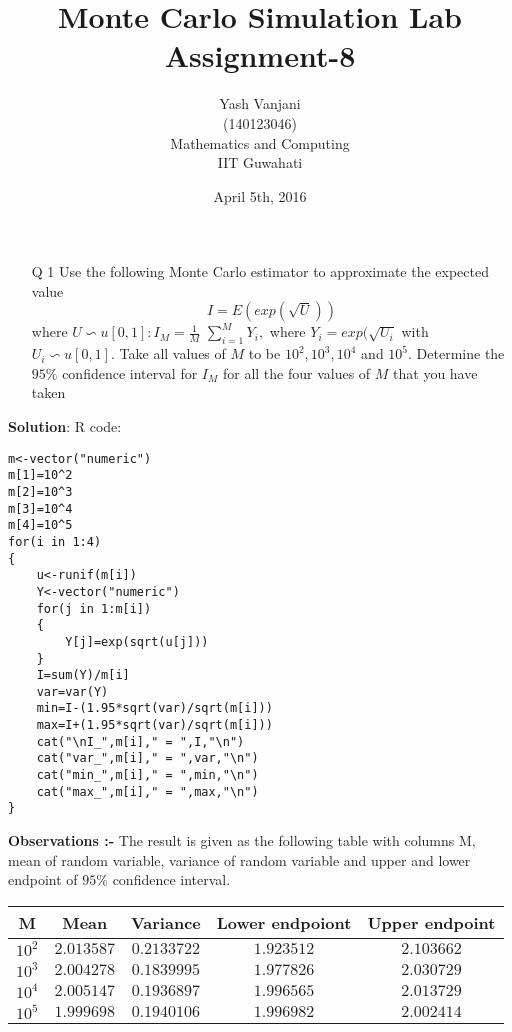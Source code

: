 \documentclass[12pt]{book}
\begin{document}
\title{\textbf{Monte Carlo Simulation Lab Assignment-8}}
\author{Yash Vanjani\\(140123046)\\Mathematics and Computing\\IIT Guwahati}
\date{April 5th, 2016}

\maketitle

\newpage
\begin{enumerate}
\item[Q 1] Use the following Monte Carlo estimator to approximate the expected value \newline $$I=E(exp(\sqrt{U}))$$ \newline where $U\backsim{u}[0,1]:I_M=\frac{1}{M}$ $\sum_{i=1}^M Y_i,$ where $Y_i= exp(\sqrt{U_i}$ with $U_i\backsim u[0,1].$ \newline Take all values of $M$ to be $10^2,10^3,10^4$ and $10^5.$  Determine the $95\%$ confidence interval for $I_M$ for all the four values of $M$ that you have taken\\
\end{enumerate}
\textbf{Solution}: R code:
\begin{lstlisting}
m<-vector("numeric")
m[1]=10^2
m[2]=10^3
m[3]=10^4
m[4]=10^5
for(i in 1:4)
{
	u<-runif(m[i])
	Y<-vector("numeric")
	for(j in 1:m[i])
	{
		Y[j]=exp(sqrt(u[j]))
	}
	I=sum(Y)/m[i]
	var=var(Y)
	min=I-(1.95*sqrt(var)/sqrt(m[i]))
	max=I+(1.95*sqrt(var)/sqrt(m[i]))
	cat("\nI_",m[i]," = ",I,"\n")
	cat("var_",m[i]," = ",var,"\n")
	cat("min_",m[i]," = ",min,"\n")
	cat("max_",m[i]," = ",max,"\n")
}
\end{lstlisting}
\newpage
\textbf{\large Observations :-} \newline
The result is given as the following table with columns M, mean of random variable, variance of random variable and upper and lower endpoint of $95\%$ confidence interval.

\begin{center}
 \begin{tabular}{||c c c c c||} 
 \hline
 M & Mean & Variance & Lower endpoiont & Upper endpoint\\ [0.5ex] 
 \hline\hline
 $10^2$ & $2.013587$ & $0.2133722$ & $1.923512$ & $2.103662$\\ 
 \hline
 $10^3$ & $2.004278$ & $0.1839995$ & $1.977826$ & $2.030729$\\
 \hline
 $10^4$ & $2.005147$ & $0.1936897$ & $1.996565$ & $2.013729$\\
 \hline
 $10^5$ & $1.999698$ & $0.1940106$ & $1.996982$ & $2.002414$\\  [1ex] 
 \hline
\end{tabular}
\end{center}
\end{document}
